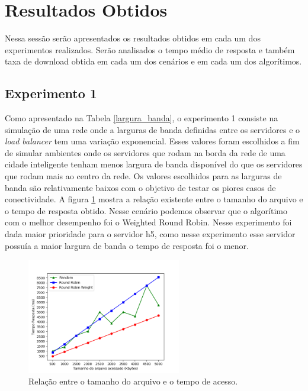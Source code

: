 \documentclass[12pt]{article}
\begin{document}
\section{Resultados Obtidos}

Nessa sessão serão apresentados os resultados obtidos em cada um dos experimentos realizados. Serão analisados o tempo médio de resposta e também taxa de download obtida em cada um dos cenários e em cada um dos algorítimos.

\subsection{Experimento 1}

Como apresentado na Tabela \ref{largura_banda}, o experimento 1 consiste na simulação de uma rede onde a larguras de banda definidas entre os servidores e o \textit{load balancer} tem uma variação exponencial. Esses valores foram escolhidos a fim de simular ambientes onde os servidores que rodam na borda da rede de uma cidade inteligente tenham menos largura de banda disponível do que os servidores que rodam mais ao centro da rede. Os valores escolhidos para as larguras de banda são relativamente baixos com o objetivo de testar os piores casos de conectividade. 
A figura \ref{fig:exp1_t} mostra a relação existente entre o tamanho do arquivo e o tempo de resposta obtido. Nesse cenário podemos observar que o algorítimo com o melhor desempenho foi o Weighted Round Robin. Nesse experimento foi dada maior prioridade para o servidor h5, como nesse experimento esse servidor possuía a maior largura de banda o tempo de resposta foi o menor. 

\begin{figure}[ht]
\centering
\includegraphics[width=0.6\textwidth]{images/exp1_time.png}
\caption{Relação entre o tamanho do arquivo e o tempo de acesso.}
\label{fig:exp1_t}
\end{figure}
\end{document}

